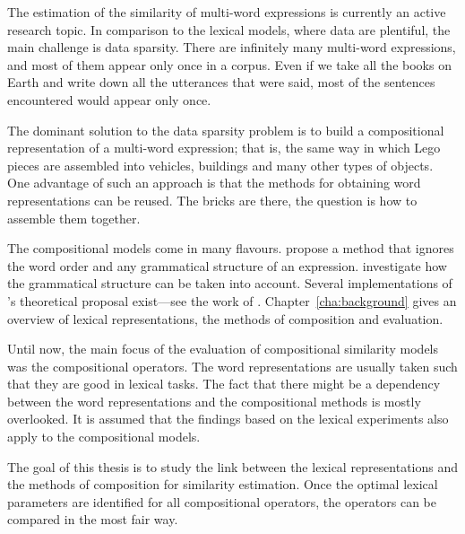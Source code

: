 The estimation of the similarity of multi-word expressions is currently an active research topic. In comparison to the lexical models, where data are plentiful, the main challenge is data sparsity. There are infinitely many multi-word expressions, and most of them appear only once in a corpus. Even if we take all the books on Earth and write down all the utterances that were said, most of the sentences encountered would appear only once.

The dominant solution to the data sparsity problem is to build a compositional representation of a multi-word expression; that is, the same way in which Lego pieces are assembled into vehicles, buildings and many other types of objects. One advantage of such an approach is that the methods for obtaining word representations can be reused. The bricks are there, the question is how to assemble them together.

The compositional models come in many flavours. \citet{mitchell2010composition} propose a method that ignores the word order and any grammatical structure of an expression. \citet{DBLP:journals/corr/abs-1003-4394,baroni2014frege} investigate how the grammatical structure can be taken into account. Several implementations of \citet{DBLP:journals/corr/abs-1003-4394}'s theoretical proposal exist---see the work of \citet{Grefenstette:2011:ESC:2145432.2145580,Grefenstette:2011:ETV:2140490.2140497,kartsadrqpl2014,fried-polajnar-clark:2015:ACL-IJCNLP}. Chapter~\ref{cha:background} gives an overview of lexical representations, the methods of composition and evaluation.

Until now, the main focus of the evaluation of compositional similarity models was the compositional operators. The word representations are usually taken such that they are good in lexical tasks. The fact that there might be a dependency between the word representations and the compositional methods is mostly overlooked. It is assumed that the findings based on the lexical experiments also apply to the compositional models.

The goal of this thesis is to study the link between the lexical representations and the methods of composition for similarity estimation. Once the optimal lexical parameters are identified for all compositional operators, the operators can be compared in the most fair way.
% 
% 

